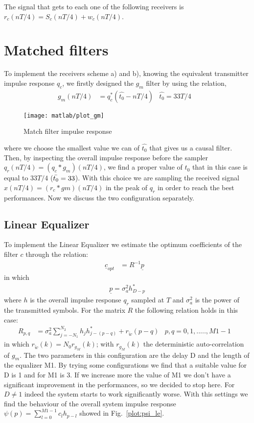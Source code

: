 \documentclass[a4paper,oneside]{article}
\renewcommand{\vec}[1]{\underline{#1}}
\begin{document}
The signal that gets to each one of the following receivers is
$r_c(nT/4) = S_c(nT/4) + w_c(nT/4)$.

\section{Matched filters}
\label{sec:mf}
To implement the receivers scheme a) and b), knowing the equivalent transmitter impulse response $q_c$, we firstly designed the $g_m$ filter by using the relation, 
\begin{align}
  g_m(n T/4) &= q_c^* (\hat{t_0}-n T/4) & \hat{t_0} = 33 T/4&
\end{align}

\begin{figure}[htbp]
  \centering
  \texttt{[image: matlab/plot\_gm]}
  \caption{Match filter impulse response}
  \label{plot:gm}
\end{figure}

where we choose the smallest value we can of $\hat{t_0}$ that gives us a causal filter. 
Then, by inspecting the overall impulse response before the sampler $q_r(n T/4) = (q_c * g_m)(n T/4)$, we find a proper value of $t_0$ that in this case is equal to $33T/4$ ($\Bar{t_0} = 33$). With this choice we are sampling the received signal $x(nT/4) = (r_c*gm)(nT/4)$ in the peak of $q_r$ in order to reach the best performances.
Now we discuss the two configuration separately.
\subsection{Linear Equalizer}
\label{sec:le}
To implement the Linear Equalizer we estimate the optimum coefficients of the filter $c$ through the relation:
\begin{align}
\vec{c}_{opt}& = R^{-1} \vec{p}&
\label{eq:c_opt}  
\end{align} 
in which 
\begin{align}
&\vec{p} = \sigma_a^2 h_{D-p}^*&
\label{eq:p}  
\end{align}
where $h$ is the overall impulse response $q_r$ sampled at $T$ and $\sigma_a^2$ is the power of the transmitted symbols. For the matrix $R$ the following relation holds in this case:
\begin{align}
 R_{p,q} &= \sigma^2_a \sum_{j=-N_1}^{N_2}h_jh^*_{j-(p-q)} + r_{\tilde{w}}(p-q) & p,q = 0,1,.....,M1-1&
  \label{eq:R_le}
\end{align}
in which $r_{\tilde{w}}(k) = N_0 r_{g_M}(k)$; with $r_{g_M}(k)$ the deterministic auto-correlation of $g_m$.
The two parameters in this configuration are the delay D and the length of the  equalizer M1. By trying some configurations we find that a suitable value for D is 1 and for M1 is 3. If we increase more the value of M1 we don't have a significant improvement in the performances, so we decided to stop here. For $D\neq 1$ indeed the system starts to work significantly worse. With this settings we find the behaviour of the overall system impulse response $\psi(p) = \sum_{l=0}^{M1-1} c_l h_{p-l}$ showed in Fig.~\ref{plot:psi_le}. 
\end{document}
